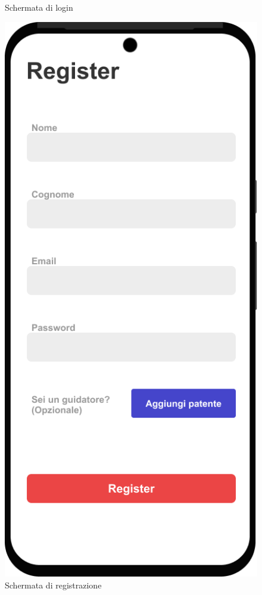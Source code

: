 \begin{figure}[H]
\begin{minipage}{0.45\textwidth}
        \caption{Schermata di login}
        \label{mockUp:loginMockup}
    \end{minipage}%
    \hfill
    \begin{minipage}{0.45\textwidth}
        \centering
        \includegraphics[width=\linewidth]{Images/Register page.png}
        \caption{Schermata di registrazione}
        \label{mockUp:registerMockup}
    \end{minipage}
\end{figure}


